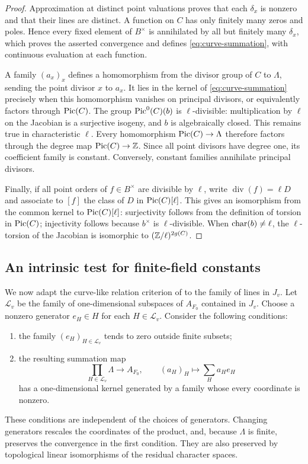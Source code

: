 \begin{proof}
Approximation at distinct point valuations proves that each
\(\delta_x\) is nonzero and that their lines are distinct.
A function on \(C\) has only finitely many zeros and poles. Hence every
fixed element of \(B^\times\) is annihilated by all but finitely many
\(\delta_x\), which proves the asserted convergence and defines
\eqref{eq:curve-summation}, with continuous evaluation at each function.

A family \((a_x)_x\) defines a homomorphism from the divisor group of
\(C\) to \(\Lambda\), sending the point divisor \(x\) to \(a_x\).
It lies in the kernel of \eqref{eq:curve-summation} precisely when
this homomorphism vanishes on principal divisors, or equivalently
factors through \(\operatorname{Pic}(C)\).
The group \(\operatorname{Pic}^0(C)(b)\) is \(\ell\)-divisible: multiplication by
\(\ell\) on the Jacobian is a surjective isogeny, and \(b\) is
algebraically closed. This remains true in characteristic \(\ell\).
Every homomorphism \(\operatorname{Pic}(C)\to\Lambda\) therefore factors through
the degree map \(\operatorname{Pic}(C)\to\mathbb Z\). Since all point divisors have degree
one, its coefficient family is constant. Conversely, constant
families annihilate principal divisors.

Finally, if all point orders of \(f\in B^\times\) are divisible by
\(\ell\), write \(\operatorname{div}(f)=\ell D\) and associate to
\([f]\) the class of \(D\) in \(\operatorname{Pic}(C)[\ell]\). This gives an
isomorphism from the common kernel to \(\operatorname{Pic}(C)[\ell]\):
surjectivity follows from the definition of torsion in \(\operatorname{Pic}(C)\);
injectivity follows because \(b^\times\) is \(\ell\)-divisible.
When \(\operatorname{char}(b)\ne\ell\), the \(\ell\)-torsion of the Jacobian is
isomorphic to \((\mathbb Z/\ell)^{2g(C)}\).
\end{proof}

\subsection{An intrinsic test for finite-field constants}

We now adapt the curve-like relation criterion of
\cite[Theorem~4.2 and appendix, Main Theorem~I, p.~353]{Pop2015}
to the family of lines in \(J_v\).
Let \(\mathcal L_v\) be the family of one-dimensional subspaces of
\(A_{F_0}\) contained in \(J_v\). Choose a nonzero generator
\(e_H\in H\) for each \(H\in\mathcal L_v\). Consider the following
conditions:
\begin{enumerate}
 \item the family \((e_H)_{H\in\mathcal L_v}\) tends to zero outside
 finite subsets;
 \item the resulting summation map
 \[
   \prod_{H\in\mathcal L_v}\Lambda\longrightarrow A_{F_0},
   \qquad (a_H)_H\longmapsto\sum_H a_H e_H
 \]
 has a one-dimensional kernel generated by a family whose every
 coordinate is nonzero.
\end{enumerate}
These conditions are independent of the choices of generators.
Changing generators rescales the coordinates of the product, and,
because \(\Lambda\) is finite, preserves the convergence in the first
condition. They are also preserved by topological linear
isomorphisms of the residual character spaces.

